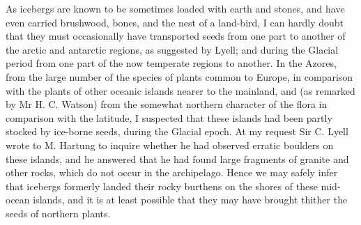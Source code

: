 \indent As icebergs are known to be sometimes loaded with earth and stones, and have even carried brushwood, bones, and the nest of a land-bird, I can hardly doubt that they must occasionally have transported seeds from one part to another of the arctic and antarctic regions, as suggested by Lyell; and during the Glacial period from one part of the now temperate regions to another. In the Azores, from the large number of the species of plants common to Europe, in comparison with the plants of other oceanic islands nearer to the mainland, and (as remarked by Mr H. C. Watson) from the somewhat northern character of the flora in comparison with the latitude, I suspected that these islands had been partly stocked by ice-borne seeds, during the Glacial epoch. At my request Sir C. Lyell wrote to M. Hartung to inquire whether he had observed erratic boulders on these islands, and he answered that he had found large fragments of granite and other rocks, which do not occur in the archipelago. Hence we may safely infer that icebergs formerly landed their rocky burthens on the shores of these mid-ocean islands, and it is at least possible that they may have brought thither the seeds of northern plants.~\\
